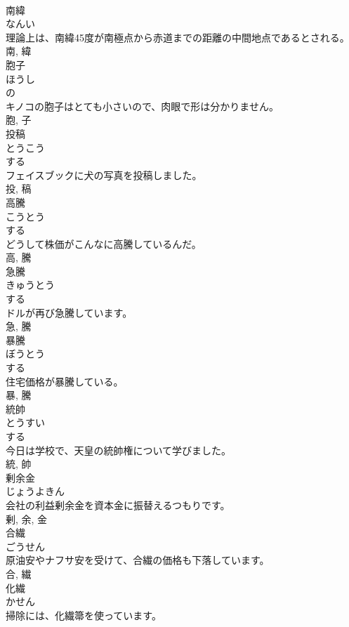 \documentclass[8pt]{extreport}
\begin{document}
\begin{CJK}{UTF8}{min}
\\	南緯	
\\	なんい	
\\	理論上は、南緯45度が南極点から赤道までの距離の中間地点であるとされる。	
\\	南, 緯	
\\	胞子	
\\	ほうし	
\\	の 
\\	キノコの胞子はとても小さいので、肉眼で形は分かりません。	
\\	胞, 子	
\\	投稿	
\\	とうこう	
\\	する 
\\	フェイスブックに犬の写真を投稿しました。	
\\	投, 稿	
\\	高騰	
\\	こうとう	
\\	する 
\\	どうして株価がこんなに高騰しているんだ。	
\\	高, 騰	
\\	急騰	
\\	きゅうとう	
\\	する 
\\	ドルが再び急騰しています。	
\\	急, 騰	
\\	暴騰	
\\	ぼうとう	
\\	する 
\\	住宅価格が暴騰している。	
\\	暴, 騰	
\\	統帥	
\\	とうすい	
\\	する 
\\	今日は学校で、天皇の統帥権について学びました。	
\\	統, 帥	
\\	剰余金	
\\	じょうよきん	
\\	会社の利益剰余金を資本金に振替えるつもりです。	
\\	剰, 余, 金	
\\	合繊	
\\	ごうせん	
\\	原油安やナフサ安を受けて、合繊の価格も下落しています。	
\\	合, 繊	
\\	化繊	
\\	かせん	
\\	掃除には、化繊箒を使っています。	

\end{CJK}
\end{document}

